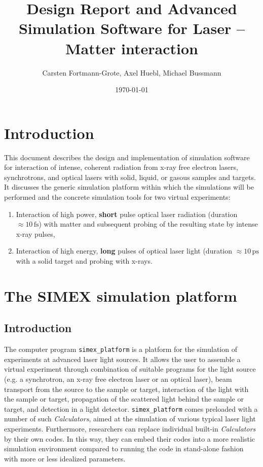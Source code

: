 \documentclass[a4paper]{article}
\title{Design Report and Advanced Simulation Software for Laser -- Matter interaction}
\author{Carsten Fortmann-Grote, Axel Huebl, Michael Bussmann } %
\date{\today}
\begin{document}
\maketitle
\section{Introduction}
This document describes the design and implementation of simulation software for interaction of intense, coherent radiation from x-ray free
electron lasers, synchrotrons, and optical lasers with solid, liquid, or gasous samples and targets.
It discusses the generic simulation platform within which the simulations will be performed and the
concrete simulation tools for two virtual experiments:
\begin{enumerate}
  \item Interaction of high power, \textbf{short} pulse optical laser radiation (duration $\approx 10\,\text{fs}$)
    with matter and subsequent probing of the resulting state by intense x-ray pulses,
  \item Interaction of high energy, \textbf{long} pulses of optical laser light (duration $\approx 10\,\text{ps}$
    with a solid target and probing with x-rays.
\end{enumerate}%

\section{The SIMEX simulation platform \label{sec:simex_platform}}
%
\subsection{Introduction}
The computer program \texttt{simex\_platform}
\cite{simex_github}
is a platform for the simulation of experiments at advanced laser light sources. It allows the
user to assemble a virtual experiment through combination of suitable programs for the light source (e.g. a synchrotron, an x-ray free electron
laser or an optical laser), beam transport from the source to the sample or target, interaction of the light with the sample or target,
propagation of the scattered light behind the sample or target, and detection in a light detector. \texttt{simex\_platform} comes preloaded with
a number of such \textit{Calculators}, aimed at the simulation of various typical laser light experiments. Furthermore, researchers
can replace individual built-in \textit{Calculators} by their own codes. In this way, they can embed their codes
into a more realistic simulation environment compared to running the code in stand-alone fashion with more or less idealized parameters.
%
\end{document}
